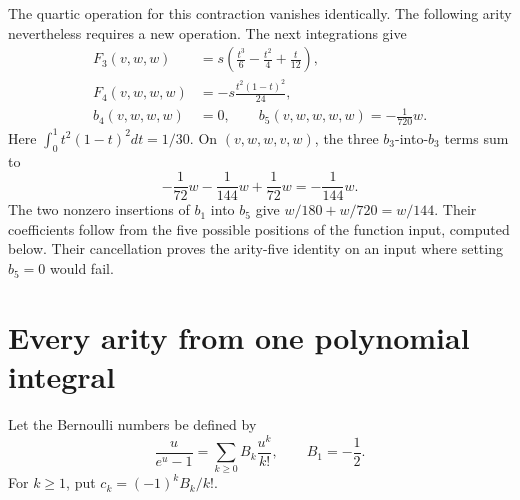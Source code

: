 The quartic operation for this contraction vanishes identically.
The following arity nevertheless requires a new operation.  The next
integrations give
\[
 \begin{split}
 F_3(v,w,w)&=s\left(\frac{t^3}{6}-\frac{t^2}{4}+\frac{t}{12}\right),\\
 F_4(v,w,w,w)&=-s\frac{t^2(1-t)^2}{24},\\
 b_4(v,w,w,w)&=0,\qquad b_5(v,w,w,w,w)=-\frac1{720}w.
 \end{split}
\]
Here $\int_0^1t^2(1-t)^2dt=1/30$.  On $(v,w,w,v,w)$, the
three $b_3$-into-$b_3$ terms sum to
\[
 -\frac1{72}w-\frac1{144}w+\frac1{72}w=-\frac1{144}w.
\]
The two nonzero insertions of $b_1$ into $b_5$ give
$w/180+w/720=w/144$.  Their coefficients follow from the five
possible positions of the function input, computed below.  Their cancellation proves the arity-five
identity on an input where setting $b_5=0$ would fail.

\section{Every arity from one polynomial integral}

Let the Bernoulli numbers be defined by
\[
 \frac{u}{e^u-1}=\sum_{k\ge0}B_k\frac{u^k}{k!},
 \qquad B_1=-\frac12.
\]
For $k\ge1$, put $c_k=(-1)^k B_k/k!$.


